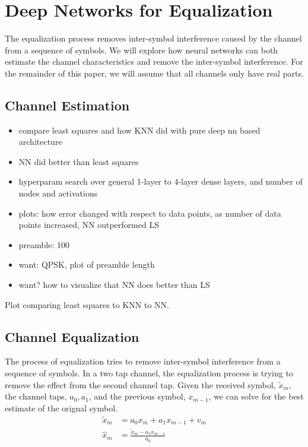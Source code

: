 \chapter[equal]{Deep Networks for Equalization\raisebox{.3\baselineskip}{\normalsize\footnotemark}}

The equalization process removes inter-symbol interference caused by the channel from a sequence of symbols.  We will explore how neural networks can both estimate the channel characteristics and remove the inter-symbol interference.  For the remainder of this paper, we will assume that all channels only have real parts. 

\section{Channel Estimation}

\begin{itemize}
\item compare least squares and how KNN did with pure deep nn based architecture
\item NN did better than least squares
\item hyperparam search over general 1-layer to 4-layer dense layers, and number of nodes and activations
\item plots: how error changed with respect to data points, as number of data points increased, NN outperformed LS
\item preamble: 100
\item want: QPSK, plot of preamble length
\item want? how to visualize that NN does better than LS
\end{itemize}

Plot comparing least squares to KNN to NN.



\section{Channel Equalization}

The process of equalization tries to remove inter-symbol interference from a sequence of symbols.  
In a two tap channel, the equalization process is trying to remove the effect from the second channel tap.  Given the received symbol, $\tilde{x}_m$, the channel taps, $a_0, a_1$, and the previous symbol, $x_{m-1}$, we can solve for the best estimate of the orignal symbol.
\begin{align}
\tilde{x}_m &= a_0 x_{m} + a_1 x_{m-1} + v_m\\
\hat{x}_m &= \frac{\tilde{x}_m - a_1 x_{m-1}}{a_0}
\end{align}

